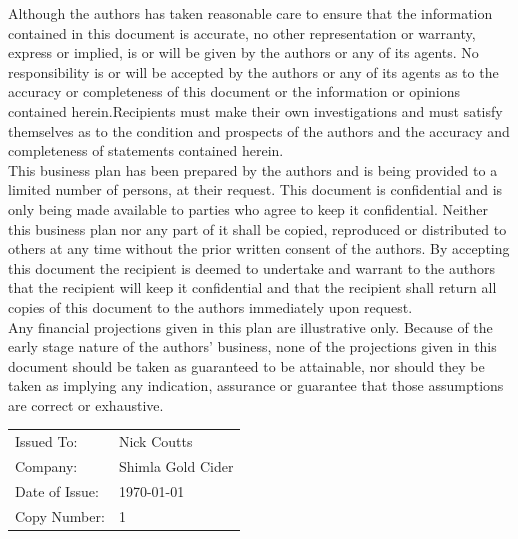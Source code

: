 \documentclass[11pt]{article}
\begin{document}
\noindent Although the authors has taken reasonable care to ensure that the information contained in this document is accurate, no other representation or warranty, express or implied, is or will be given by the authors or any of its agents. No responsibility is or will be accepted by the authors or any of its agents as to the accuracy or completeness of this document or the information or opinions contained herein.Recipients must make their own investigations and must satisfy themselves as to the condition and prospects of the authors and the accuracy and completeness of statements contained herein. \\

\noindent This business plan has been prepared by the authors and is being provided to a limited number of persons, at their request. This document is confidential and is only being made available to parties who agree to keep it confidential. Neither this business plan nor any part of it shall be copied, reproduced or distributed to others at any time without the prior written consent of the authors. By accepting this document the recipient is deemed to undertake and warrant to the authors that the recipient will keep it confidential and that the recipient shall return all copies of this document to the authors immediately upon request. \\

\noindent Any financial projections given in this plan are illustrative only. Because of the early stage nature of the authors' business, none of the projections given in this document should be taken as guaranteed to be attainable, nor should they be taken as implying any indication, assurance or guarantee that those assumptions are correct or exhaustive.
\vfill
\begin{table}[H]
\begin{center}
\begin{tabular}{| l l |}
\hline
Issued To:      &  Nick Coutts        \\
Company:        &  Shimla Gold Cider  \\
Date of Issue:  &  \today            \\
Copy Number:    &  1                  \\
\hline
\end{tabular}
\end{center}
\end{table}

\newpage
\tableofcontents

\newpage
\end{document}
